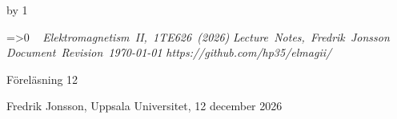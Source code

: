 {{{{{{\cleardoublepage
%
%
%
%
%
%
%
\def\coursename{Elektromagnetism II}
\def\coursecode{1TE626}
\def\courseyear{2026}
\def\courserepo{https://github.com/hp35/elmagii/}
\def\lecturenumber{12}
\def\lecturetitle{Grundl{\"a}ggande antennteori}
\def\lecturesubtitle{}
\def\lectureauthor{Fredrik Jonsson}
\def\lectureplace{Uppsala Universitet}
\def\lecturedate{12 december 2026}
\edef\expandedlecturenumber{12}
\def\ifempty#1{\ifx\relax#1\relax}
\advance\chapno by 1
\immediate{}
\hsize=150mm\hoffset=4.6mm\vsize=230mm\voffset=7mm
\topskip=0pt\baselineskip=12pt\parskip=0pt\leftskip=0pt\parindent=15pt
\ifcolors
  \voffset=-10.2mm\topskip=0pt
\fi
\headline={\ifnum\secno>0\ifodd\pageno\rightheadline\else\leftheadline\fi
  \else\hfill\fi}
\def\rightheadline{\tenrm{\it F\"orel\"asning 12}
  \hfil{\it \coursename, \coursecode\ (\courseyear)}}
\def\leftheadline{\tenrm{\it \coursename, \coursecode\ (\courseyear)}
  \hfil{\it F\"orel\"asning 12}}
\noindent~\vskip-60pt\hskip-40pt{}
\vskip-42pt\hfill\vbox{
    \hbox{{\it \coursename, \coursecode\ (\courseyear)}}
    \hbox{{\it Lecture Notes, \lectureauthor}}
    \hbox{{\it Document Revision \today}}
    \hbox{{\it \courserepo}}}\vskip 36pt
\centerline{\twelvesc F\"orel\"asning 12}
\vskip 24pt\noindent
\centerline{}
\expandafter\ifempty\expandafter{\lecturesubtitle}%
  \else\centerline{\twelvesc\lecturesubtitle}\fi
\bigskip
\centerline{\lectureauthor, \lectureplace, \lecturedate}
\vskip24pt



}}}}}}
